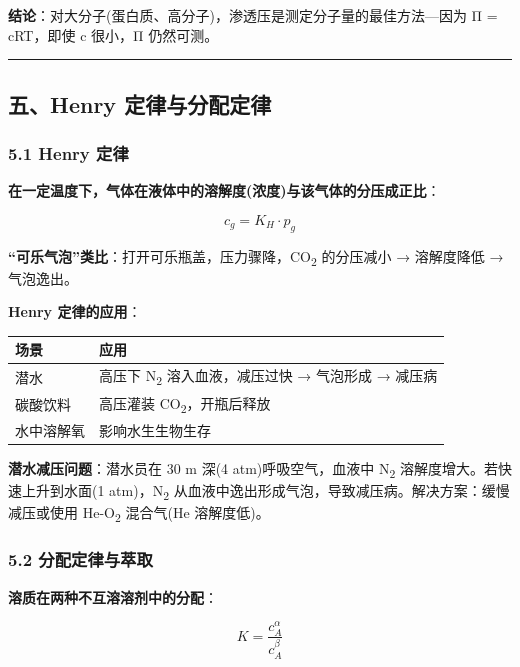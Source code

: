 \documentclass[a4paper,11pt]{ctexart}
\newcounter{none}
\begin{document}
\textbf{结论}：对大分子(蛋白质、高分子)，渗透压是测定分子量的最佳方法---因为 Π = cRT，即使 c 很小，Π 仍然可测。

\begin{center}\rule{0.5\linewidth}{0.5pt}\end{center}

\subsection{五、Henry 定律与分配定律}\label{ux4e94henry-ux5b9aux5f8bux4e0eux5206ux914dux5b9aux5f8b}

\subsubsection{5.1 Henry 定律}\label{henry-ux5b9aux5f8b}

\textbf{在一定温度下，气体在液体中的溶解度(浓度)与该气体的分压成正比}：

\[
\boxed{c_g = K_H \cdot p_g}
\]

\textbf{``可乐气泡''类比}：打开可乐瓶盖，压力骤降，CO\textsubscript{2} 的分压减小 → 溶解度降低 → 气泡逸出。

\textbf{Henry 定律的应用}：

{\def\LTcaptype{none} %
\begin{longtable}[]{@{}ll@{}}
\toprule\noalign{}
场景 & 应用 \\
\midrule\noalign{}
\endhead
\bottomrule\noalign{}
\endlastfoot
潜水 & 高压下 N\textsubscript{2} 溶入血液，减压过快 → 气泡形成 → 减压病 \\
碳酸饮料 & 高压灌装 CO\textsubscript{2}，开瓶后释放 \\
水中溶解氧 & 影响水生生物生存 \\
\end{longtable}
}

\textbf{潜水减压问题}：潜水员在 30 m 深(4 atm)呼吸空气，血液中 N\textsubscript{2} 溶解度增大。若快速上升到水面(1 atm)，N\textsubscript{2} 从血液中逸出形成气泡，导致减压病。解决方案：缓慢减压或使用 He-O\textsubscript{2} 混合气(He 溶解度低)。

\subsubsection{5.2 分配定律与萃取}\label{ux5206ux914dux5b9aux5f8bux4e0eux8403ux53d6}

\textbf{溶质在两种不互溶溶剂中的分配}：

\[
\boxed{K = \frac{c_A^\alpha}{c_A^\beta}}
\]
\end{document}
